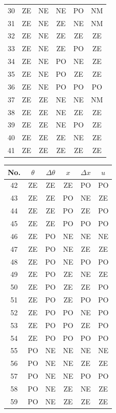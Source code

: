 \begin{table}[ht]
\begin{minipage}{0.48\textwidth}
\begin{tabular}{cccccc}
			30 & ZE & NE & NE & PO & NM \\
			31 & ZE & NE & ZE & NE & NM \\
			32 & ZE & NE & ZE & ZE & ZE \\
			33 & ZE & NE & ZE & PO & ZE \\
			34 & ZE & NE & PO & NE & ZE \\
			35 & ZE & NE & PO & ZE & ZE \\
			36 & ZE & NE & PO & PO & PO \\
			37 & ZE & ZE & NE & NE & NM \\
			38 & ZE & ZE & NE & ZE & ZE \\
			39 & ZE & ZE & NE & PO & ZE \\
			40 & ZE & ZE & ZE & NE & ZE \\
			41 & ZE & ZE & ZE & ZE & ZE \\
			\bottomrule
		\end{tabular}
	\end{minipage}
	\hfill
	\begin{minipage}{0.48\textwidth}
		\centering
		\begin{tabular}{cccccc}
			\toprule
			No. & $\theta$ & $\Delta\theta$ & $x$ & $\Delta x$ & $u$ \\
			\midrule
			42 & ZE & ZE & ZE & PO & PO \\
			43 & ZE & ZE & PO & NE & ZE \\
			44 & ZE & ZE & PO & ZE & PO \\
			45 & ZE & ZE & PO & PO & PO \\
			46 & ZE & PO & NE & NE & NE \\
			47 & ZE & PO & NE & ZE & ZE \\
			48 & ZE & PO & NE & PO & PO \\
			49 & ZE & PO & ZE & NE & ZE \\
			50 & ZE & PO & ZE & ZE & PO \\
			51 & ZE & PO & ZE & PO & PO \\
			52 & ZE & PO & PO & NE & PO \\
			53 & ZE & PO & PO & ZE & PO \\
			54 & ZE & PO & PO & PO & PO \\
			55 & PO & NE & NE & NE & NE \\
			56 & PO & NE & NE & ZE & ZE \\
			57 & PO & NE & NE & PO & PO \\
			58 & PO & NE & ZE & NE & ZE \\
			59 & PO & NE & ZE & ZE & ZE \\

\end{tabular}
\end{minipage}
\end{table}
